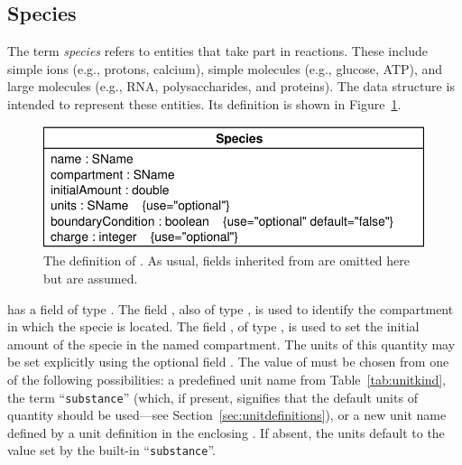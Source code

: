 \documentclass[10pt]{cekarticle}
\newcommand{\vref}[1]{\ref{#1}}
\newcommand{\changed}[1]{\textcolor{BrickRed}{#1}}
\begin{document}
\subsection{Species}
\label{sec:species}

The term \emph{species} refers to entities that take part in reactions.
These include simple ions (e.g., protons, calcium), simple molecules (e.g.,
glucose, ATP), and large molecules (e.g., RNA, polysaccharides, and
proteins).  The  data structure is intended to represent
these entities.  Its definition is shown in Figure~\vref{fig:species}.

\begin{figure}[htb]
  \centering
  \vspace*{5pt}
  \includegraphics[scale = 0.65]{species}
  \caption{The definition of .  As usual, fields inherited from
     are omitted here but are assumed.}
  \label{fig:species}
\end{figure}

 has a  field of type .  The field
, also of type , is used to identify the
compartment in which the specie is located.  The field
, of type , is used to set the initial
amount of the specie in the named compartment.  The units of \changed{this
  quantity may be set explicitly using the optional field \attrib{units}.
  The value of \attrib{units} must be chosen from one of the following
  possibilities: a predefined unit name from Table~\ref{tab:unitkind}, the
  term ``\texttt{substance}'' (which, if present, signifies that the
  default} \changed{units of quantity should be used---see
  Section~\ref{sec:unitdefinitions}), or a new unit name defined by a unit
  definition in the enclosing \class{Model}.  If absent, the units default
  to the value set by the built-in ``\texttt{substance}''.}
\end{document}
